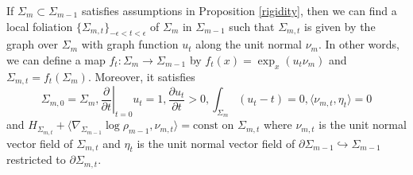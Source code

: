 \documentclass[10pt,a4paper]{amsart}
\begin{document}
\begin{lemma}\label{foliation}
    If $\Sigma_{m}\subset \Sigma_{m-1}$ satisfies assumptions in Proposition \ref{rigidity}, then we can find a local foliation $\{\Sigma_{m,t}\}_{-\epsilon<t<\epsilon}$ of $\Sigma_{m}$ in $\Sigma_{m-1}$ such that $\Sigma_{m,t}$ is given by the graph over $\Sigma_m$ with graph function $u_t$ along the unit normal $\nu_m$. In other words, we can define a map $f_{t}:\Sigma_{m}\rightarrow \Sigma_{m-1}$ by $f_{t}(x)=\exp_{x}(u_{t}\nu_{m})$ and $\Sigma_{m,t} = f_{t}(\Sigma_{m})$. Moreover, it satisfies $$\Sigma_{m,0}=\Sigma_{m}, \left.\frac{\partial}{\partial t}\right|_{t=0}u_{t}=1, \frac{\partial u_{t}}{\partial t}>0, \int_{\Sigma_{m}}(u_{t}-t)=0, \langle \nu_{m,t},\eta_{t}\rangle=0$$ and $H_{\Sigma_{m,t}}+\langle \nabla_{\Sigma_{m-1}}\log \rho_{m-1},\nu_{m,t}\rangle = \text{const}$ on $\Sigma_{m,t}$ where $\nu_{m,t}$ is the unit normal vector field of $\Sigma_{m,t}$ and $\eta
    _{t}$ is the unit normal vector field of $\partial \Sigma_{m-1}\hookrightarrow \Sigma_{m-1}$ restricted to $\partial \Sigma_{m,t}$.
\end{lemma}
\end{document}
